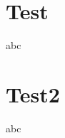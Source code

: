 \documentclass{beamer}
\begin{document}
    \section{Test}
    \begin{frame}
        abc
    \end{frame}     

    \section{Test2}
    \begin{frame}
        abc
    \end{frame} 
\end{document}
